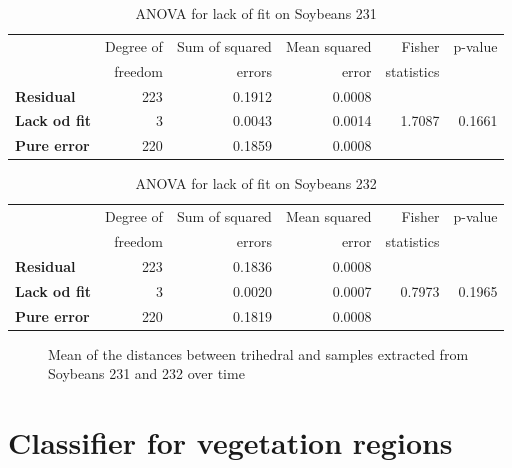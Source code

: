 \documentclass[12pt]{article}
\begin{document}
\begin{table}[hbt]
  \centering
  \caption{ANOVA for lack of fit on Soybeans 231}
  \label{tab:anova_sb231}
  \begin{tabular}{lrrrrr}
    \toprule
    & Degree of & Sum of squared & Mean squared & Fisher & p-value\\
    & freedom & errors & error & statistics &\\
    \cmidrule(lr){2-6}
    \textbf{Residual} & 223 & 0.1912 & 0.0008 & &\\
    \textbf{Lack od fit} & 3 & 0.0043 & 0.0014 & 1.7087 & 0.1661\\
    \textbf{Pure error} & 220 & 0.1859 & 0.0008 & &\\
    \bottomrule
  \end{tabular}
\end{table}

\begin{table}[hbt]
  \centering
  \caption{ANOVA for lack of fit on Soybeans 232}
  \label{tab:anova_sb232}
  \begin{tabular}{lrrrrr}
    \toprule
    & Degree of & Sum of squared & Mean squared & Fisher & p-value\\
    & freedom & errors & error & statistics &\\
    \cmidrule(lr){2-6}
    \textbf{Residual} & 223 & 0.1836 & 0.0008 & &\\
    \textbf{Lack od fit} & 3 & 0.0020 & 0.0007 & 0.7973 & 0.1965\\
    \textbf{Pure error} & 220 & 0.1819 & 0.0008 & &\\
    \bottomrule
  \end{tabular}
\end{table}

\begin{figure}[hbt]
  \caption{Mean of the distances between trihedral and samples extracted from Soybeans 231 and 232 over time}
  \label{fig:tri_mean_sb_231_232}
\end{figure}

\section{Classifier for vegetation regions}
\end{document}
